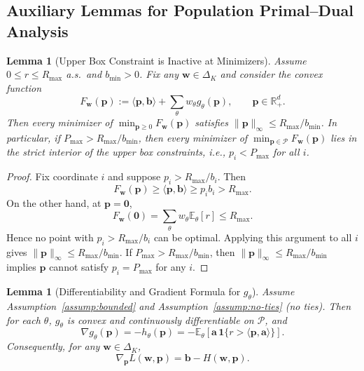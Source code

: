 \documentclass[11pt]{article}
\newtheorem{lemma}[theorem]{Lemma}
\newcommand{\bb}{\mathbf{b}}
\newcommand{\ba}{\mathbf{a}}
\newcommand{\bp}{\mathbf{p}}
\newcommand{\bw}{\mathbf{w}}
\newcommand{\E}{\mathbb{E}}
\newcommand{\R}{\mathbb{R}}
\newcommand{\cP}{\mathcal{P}}
\begin{document}
\subsection{Auxiliary Lemmas for Population Primal--Dual Analysis}

\begin{lemma}[Upper Box Constraint is Inactive at Minimizers]
\label{lem:upper-box-inactive}
Assume $0 \le r \le R_{\max}$ a.s.\ and $b_{\min} > 0$. Fix any $\bw \in \Delta_K$ and consider the convex function
\[
F_{\bw}(\bp) := \langle \bp, \bb \rangle + \sum_{\theta} w_\theta g_\theta(\bp), \qquad \bp \in \R_+^d.
\]
Then every minimizer of $\min_{\bp \ge 0} F_{\bw}(\bp)$ satisfies $\|\bp\|_\infty \le R_{\max}/b_{\min}$.
In particular, if $P_{\max} > R_{\max}/b_{\min}$, then every minimizer of $\min_{\bp \in \cP} F_{\bw}(\bp)$ lies in the strict interior of the upper box constraints, i.e., $p_i < P_{\max}$ for all $i$.
\end{lemma}

\begin{proof}
Fix coordinate $i$ and suppose $p_i > R_{\max}/b_i$. Then
\[
F_{\bw}(\bp) \ge \langle \bp, \bb \rangle \ge p_i b_i > R_{\max}.
\]
On the other hand, at $\bp = \mathbf{0}$,
\[
F_{\bw}(\mathbf{0}) = \sum_{\theta} w_\theta \E_\theta[r] \le R_{\max}.
\]
Hence no point with $p_i > R_{\max}/b_i$ can be optimal. Applying this argument to all $i$ gives $\|\bp\|_\infty \le R_{\max}/b_{\min}$. If $P_{\max} > R_{\max}/b_{\min}$, then $\|\bp\|_\infty \le R_{\max}/b_{\min}$ implies $\bp$ cannot satisfy $p_i = P_{\max}$ for any $i$.
\end{proof}

\begin{lemma}[Differentiability and Gradient Formula for $g_\theta$]
\label{lem:grad-g-pop}
Assume Assumption~\ref{assump:bounded} and Assumption~\ref{assump:no-ties} (no ties).
Then for each $\theta$, $g_\theta$ is convex and continuously differentiable on $\cP$, and
\[
\nabla g_\theta(\bp) = -h_\theta(\bp) = -\E_\theta\!\left[\ba \, \mathbf{1}\{r > \langle \bp, \ba \rangle\}\right].
\]
Consequently, for any $\bw \in \Delta_K$,
\[
\nabla_{\bp} L(\bw, \bp) = \bb - H(\bw, \bp).
\]
\end{lemma}
\end{document}
